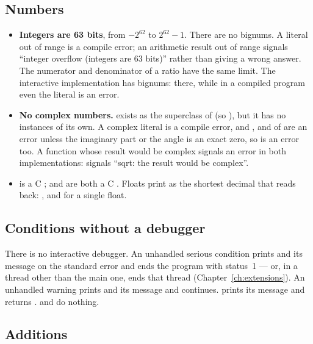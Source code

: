 \subsection{Numbers}

\begin{itemize}
\item \textbf{Integers are 63 bits}, from $-2^{62}$ to $2^{62}-1$. There
  are no bignums. A literal out of range is a compile error; an
  arithmetic result out of range signals ``integer overflow (integers are
  63 bits)'' rather than giving a wrong answer. The numerator and
  denominator of a ratio have the same limit. The interactive
  implementation has bignums: 
  \yields{}  there, while in a compiled program
  even the literal is an error.
\item \textbf{No complex numbers.}  exists as the
  superclass of  (so 
  \yields{} ), but it has no instances of its own. A complex
  literal is a compile error, and ,
   and  of  are an error
  unless the imaginary part or the angle is an exact zero, so
   is an error too. A function whose
  result would be complex signals an
  error in both implementations:  signals ``sqrt: the
  result would be complex''.
\item {} is a C ; 
  and  are both a C . Floats print
  as the shortest decimal that reads back: , and 
  for a single float.
\end{itemize}

\subsection{Conditions without a debugger}

There is no interactive debugger. An unhandled serious condition prints
 and its message on the standard error and ends the
program with status~1 --- or, in a thread other than the main one, ends
that thread (Chapter~\ref{ch:extensions}). An unhandled warning prints
 and its message and continues. 
prints its message and returns .  and
 do nothing.

\subsection{Additions}

